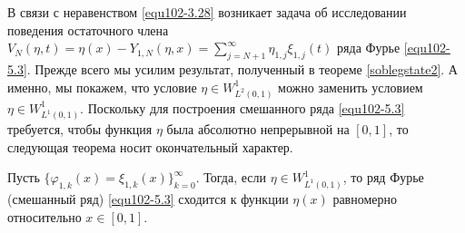  В связи с неравенством \eqref{equ102-3.28} возникает задача об исследовании поведения остаточного члена $ V_N(\eta,t)=\eta(x)- Y_{1,N}(\eta,x)
=\sum\nolimits_{j=N+1}^\infty \hat \eta_{1,j}\xi_{1,j}(t)$  ряда Фурье \eqref{equ102-5.3}. Прежде всего мы усилим результат, полученный в теореме \ref{soblegstate2}. А именно, мы покажем, что  условие $\eta\in W^1_{L^2(0,1)}$ можно заменить условием $\eta\in W^1_{L^1(0,1)}$. Поскольку для построения смешанного ряда \eqref{equ102-5.3} требуется, чтобы функция $\eta$ была абсолютно непрерывной на $[0,1]$, то следующая теорема носит окончательный характер.
\begin{theorem}\label{equtheo5}
 Пусть $\{\varphi_{1,k}(x)=\xi_{1,k}(x)\}_{k=0}^\infty$. Тогда, если $\eta\in W^1_{L^1(0,1)}$, то ряд Фурье (смешанный ряд) \eqref{equ102-5.3} сходится к функции $\eta(x)$ равномерно относительно $x\in[0,1]$.
 \end{theorem}

